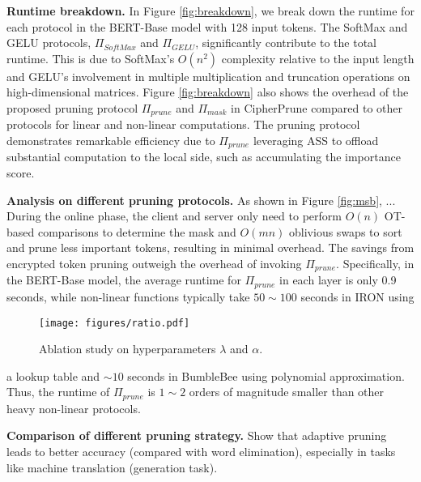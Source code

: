\noindent\textbf{Runtime breakdown.}
In Figure \ref{fig:breakdown}, we break down the runtime for each protocol in the BERT-Base model with 128 input tokens. The SoftMax and GELU protocols, $\Pi_{SoftMax}$ and $\Pi_{GELU}$, significantly contribute to the total runtime. This is due to SoftMax's $O(n^2)$ complexity relative to the input length and GELU's involvement in multiple multiplication and truncation operations on high-dimensional matrices. Figure \ref{fig:breakdown} also shows the overhead of the proposed pruning protocol $\Pi_{prune}$ and $\Pi_{mask}$ in CipherPrune compared to other protocols for linear and non-linear computations. The pruning protocol demonstrates remarkable efficiency due to $\Pi_{prune}$ leveraging ASS to offload substantial computation to the local side, such as accumulating the importance score.

\noindent\textbf{Analysis on different pruning protocols.}
As shown in Figure \ref{fig:msb}, ...
During the online phase, the client and server only need to perform $O(n)$ OT-based comparisons to determine the mask and $O(mn)$ oblivious swaps to sort and prune less important tokens, resulting in minimal overhead. The savings from encrypted token pruning outweigh the overhead of invoking $\Pi_{prune}$. Specifically, in the BERT-Base model, the average runtime for $\Pi_{prune}$ in each layer is only 0.9 seconds, while non-linear functions typically take $50\sim100$ seconds in IRON using
\begin{wrapfigure}{r}{0.35\textwidth}  %
    \centering
    \texttt{[image: figures/ratio.pdf]}
    \captionsetup{skip=2pt}
    \caption{Ablation study on hyperparameters $\lambda$ and $\alpha$.}
    \label{fig:param}
    \vspace{-0.2in}
\end{wrapfigure}
a lookup table and $\sim10$ seconds in BumbleBee using polynomial approximation. Thus, the runtime of $\Pi_{prune}$ is $1\sim2$ orders of magnitude smaller than other heavy non-linear protocols.

\noindent\textbf{Comparison of different pruning strategy.} Show that adaptive pruning leads to better accuracy (compared with word elimination), especially in tasks like machine translation (generation task).  

